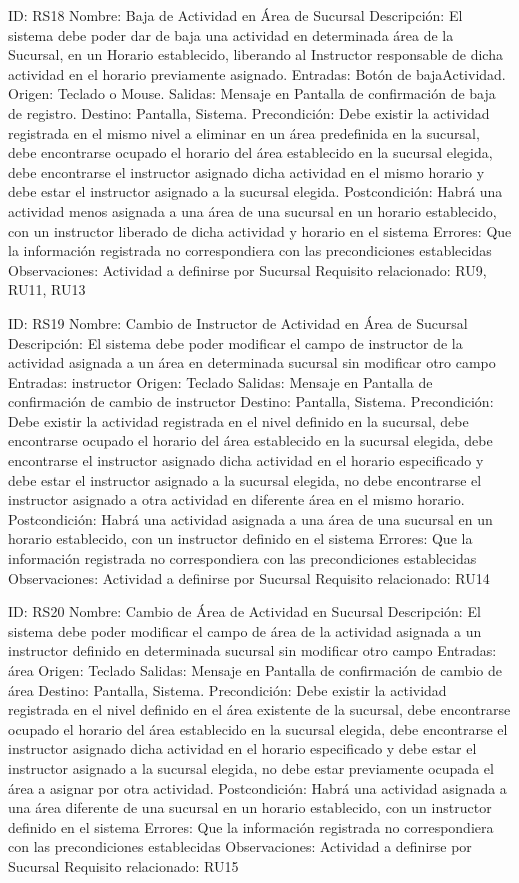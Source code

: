 ID: RS18
Nombre: Baja de Actividad en Área de Sucursal
Descripción: El sistema debe poder dar de baja una actividad en determinada área de la Sucursal, en un Horario establecido, liberando al Instructor responsable de dicha actividad en el horario previamente asignado.
Entradas: Botón de bajaActividad.
Origen: Teclado o Mouse.
Salidas: Mensaje en Pantalla de confirmación de baja de registro. 
Destino: Pantalla, Sistema.
Precondición: Debe existir la actividad registrada en el mismo nivel a eliminar en un área predefinida en la sucursal, debe encontrarse ocupado el horario del área establecido en la sucursal elegida, debe encontrarse el instructor asignado dicha actividad en el mismo horario y debe estar el instructor asignado a la sucursal elegida.
Postcondición: Habrá una actividad menos asignada a una área de una sucursal en un horario establecido, con un instructor liberado de dicha actividad y horario en el sistema
Errores: Que la información registrada no correspondiera con las precondiciones establecidas
Observaciones: Actividad a definirse por Sucursal
Requisito relacionado: RU9, RU11, RU13

ID: RS19
Nombre: Cambio de Instructor de Actividad en Área de Sucursal
Descripción: El sistema debe poder modificar el campo de instructor de la actividad asignada a un área en determinada sucursal sin modificar otro campo
Entradas: instructor
Origen: Teclado
Salidas: Mensaje en Pantalla de confirmación de cambio de instructor
Destino: Pantalla, Sistema.
Precondición: Debe existir la actividad registrada en el nivel definido en la sucursal, debe encontrarse ocupado el horario del área establecido en la sucursal elegida, debe encontrarse el instructor asignado dicha actividad en el horario especificado y debe estar el instructor asignado a la sucursal elegida, no debe encontrarse el instructor asignado a otra actividad en diferente área en el mismo horario.
Postcondición: Habrá una actividad asignada a una área de una sucursal en un horario establecido, con un instructor definido en el sistema
Errores: Que la información registrada no correspondiera con las precondiciones establecidas
Observaciones: Actividad a definirse por Sucursal
Requisito relacionado: RU14
 
ID: RS20
Nombre: Cambio de Área de Actividad en Sucursal
Descripción: El sistema debe poder modificar el campo de área de la actividad asignada a un instructor definido en determinada sucursal sin modificar otro campo
Entradas: área
Origen: Teclado
Salidas: Mensaje en Pantalla de confirmación de cambio de área
Destino: Pantalla, Sistema.
Precondición: Debe existir la actividad registrada en el nivel definido en el área existente de la sucursal, debe encontrarse ocupado el horario del área establecido en la sucursal elegida, debe encontrarse el instructor asignado dicha actividad en el horario especificado y debe estar el instructor asignado a la sucursal elegida, no debe estar previamente ocupada el área a asignar por otra actividad.
Postcondición: Habrá una actividad asignada a una área diferente de una sucursal en un horario establecido, con un instructor definido en el sistema
Errores: Que la información registrada no correspondiera con las precondiciones establecidas
Observaciones: Actividad a definirse por Sucursal
Requisito relacionado: RU15

